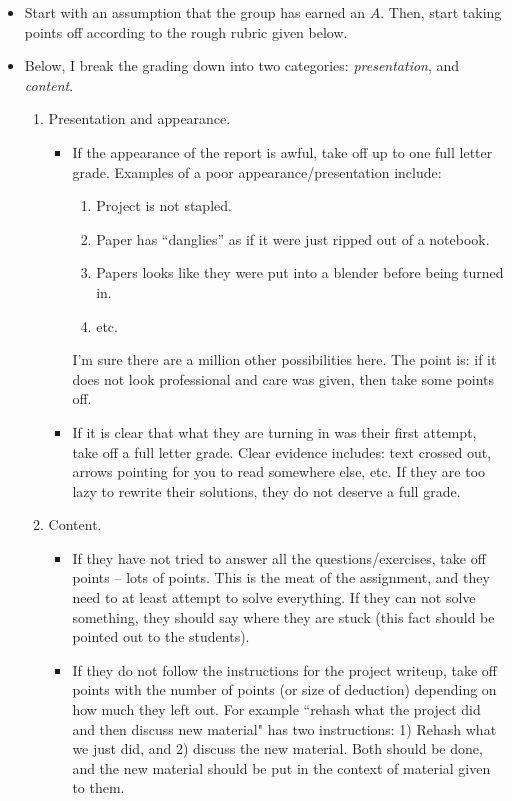 \documentclass[12pt]{article}
\theoremstyle{definition}
\begin{document}
\begin{itemize}
\item Start with an assumption that the group has earned an $A$.
  Then, start taking points off according to the  rough rubric given below.
  
  \item   Below, I break the grading down into two categories: \textit{presentation}, and \textit{content}.
  \begin{enumerate}
  \item Presentation and appearance.
    \begin{itemize}
    \item If the appearance of the report is awful, take off up to one full letter
      grade.  Examples of a poor appearance/presentation
      include:
      \begin{enumerate}
      \item Project is not stapled.
      \item Paper has ``danglies'' as if it were just ripped out of a
        notebook.
        \item Papers looks like they were put into a blender before being turned in.
      \item etc.
      \end{enumerate}
      I'm sure there are a million other possibilities here.  The
      point is: if it does not look professional and care was given, then take some points off.
      \vspace{.2in}
	
    \item If it is clear that what they are turning in was their first
      attempt, take off a full letter grade.  Clear evidence includes:
      text crossed out, arrows pointing for you to read somewhere
      else, etc.  If they are too lazy to rewrite their solutions,
      they do not deserve a full grade.
    \end{itemize}
    
    \vspace{.2in}
	
  \item Content.
    \begin{itemize}
    \item If they have not tried to answer all the questions/exercises, take off points -- lots of points.  This is the meat of the assignment, and they need to at least attempt to solve everything.  If they can not solve something, they should say where they are stuck (this fact should be pointed out to the students). \vspace{.2in} 
    \item If they do not follow the instructions for the project writeup, take off points with the number of points (or size of deduction) depending on how much they left out. For example ``rehash what the project did and then discuss new material" has two instructions: 1) Rehash what we just did, and 2) discuss the new material.  Both should be done, and the new material should be put  in the context of material given to them.
    \end{itemize}
  \end{enumerate}
  

\end{itemize}
\end{document}
